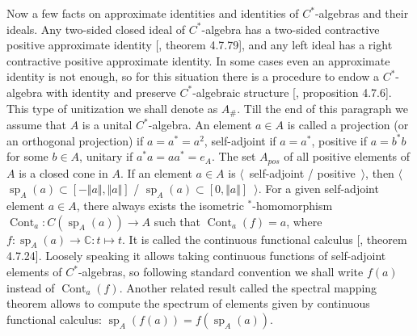 Now a few facts on approximate identities and identities of $C^*$-algebras and
their ideals. Any two-sided closed ideal of $C^*$-algebra has a two-sided
contractive positive approximate identity [\cite{HelBanLocConvAlg}, theorem
4.7.79], and any left ideal has a right contractive positive approximate
identity. In some cases even an approximate identity is not enough, so for this
situation there is a procedure to endow a $C^*$-algebra with identity and
preserve $C^*$-algebraic structure [\cite{HelBanLocConvAlg}, proposition 4.7.6].
This type of unitization we shall denote as $A_\#$. Till the end of this
paragraph we assume that $A$ is a unital $C^*$-algebra. An element $a\in A$ is
called a projection (or an orthogonal projection) if $a=a^*=a^2$, self-adjoint
if $a=a^*$, positive if $a=b^*b$ for some $b\in A$, unitary if $a^*a=aa^*=e_A$.
The set $A_{pos}$ of all positive elements of $A$ is a closed cone in $A$. If an
element $a\in A$ is $\langle$~self-adjoint / positive~$\rangle$, then
$\langle$~$\operatorname{sp}_A(a)\subset[-\Vert a\Vert, \Vert a\Vert]$ /
$\operatorname{sp}_A(a)\subset[0,\Vert a\Vert]$~$\rangle$. For a given
self-adjoint element $a\in A$, there always exists the isometric
${}^*$-homomorphism $\operatorname{Cont}_a:C(\operatorname{sp}_A(a))\to A$ such
that $\operatorname{Cont}_a(f)=a$, where
$f:\operatorname{sp}_A(a)\to\mathbb{C}:t\mapsto t$. It is called the continuous
functional calculus [\cite{HelBanLocConvAlg}, theorem 4.7.24]. Loosely speaking
it allows taking continuous functions of self-adjoint elements of
$C^*$-algebras, so following standard convention we shall write $f(a)$ instead
of $\operatorname{Cont}_a(f)$. Another related result called the spectral
mapping theorem allows to compute the spectrum of elements given by continuous
functional calculus: $\operatorname{sp}_A(f(a))=f(\operatorname{sp}_A(a))$.

